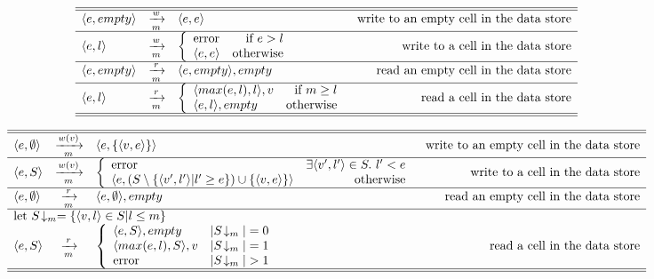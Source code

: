 

\begin{table*}
\[
\begin{array}{lclr}
\hline\hline
\langle e,empty \rangle & \xrightarrow[m]{w} & \langle e,e \rangle & \mbox{write to an empty cell in the data store}\\
\hline
\langle e,l \rangle & \xrightarrow[m]{w} & \left \{ \begin{array}{lr} \mbox{error} & \mbox{if} ~ e > l \\ \langle e,e \rangle & \mbox{otherwise} \end{array} \right. & \mbox{write to a cell in the data store}\\
\hline
\langle e,empty \rangle & \xrightarrow[m]{r} & \langle e,empty \rangle, empty & \mbox{read an empty cell in the data store}\\
\hline
\langle e,l \rangle & \xrightarrow[m]{r} & \left \{ \begin{array}{lr} \langle max(e,l),l \rangle, v & \mbox{if} ~ m \geq l \\ \langle e,l \rangle, empty & \mbox{otherwise} \end{array} \right. & \mbox{read a cell in the data store}\\
\hline\hline
\end{array}
\]
\caption{\label{ta:ifc-total}%
Small-step operational semantics for enforcing IFC with a total order over the security labels. $m$ is a paramater of the program execution s.t. m is the maximal security label allowed for the execution.}
\end{table*}

\begin{table*}
\[
\begin{array}{lclr}
\hline\hline
\semrule{\tuple{e,\emptyset}}{w(v)}{\tuple{e,\{\tuple{v,e}\}}}{\mbox{write to an empty cell in the data store}}\\
\hline
\semrule{\tuple{e,S}}
        {w(v)}
        {\case{\mbox{error}}
              {\exists \tuple{v',l'} \in S. ~ l' < e}
              {\tuple{e,(S \setminus \{\tuple{v',l'} | l' \geq e \}) \cup \{\tuple{v,e}\}}}
              {\mbox{otherwise}}}
        {\mbox{write to a cell in the data store}}\\
\hline
\semrule{\tuple{e,\emptyset}} {r} {\tuple{e,\emptyset}, empty} {\mbox{read an empty cell in the data store}}\\
\hline
\multicolumn{4} {l} {\mbox{let}~ S\!\downarrow_m = \{\tuple{v,l}\in S | l \leq m\} }\\
\semrule{\tuple{e,S}}
        {r}
        {\casethree{\tuple{e,S}, empty} {|S\!\downarrow_m| = 0}
                   {\tuple{max(e,l), S}, v} {|S\!\downarrow_m| = 1}
                   {\mbox{error}}{|S\!\downarrow_m| > 1}}
        {\mbox{read a cell in the data store}}\\
\hline\hline
\end{array}
\]
\caption{\label{ta:ifc-partial}%
Small-step operational semantics for enforcing IFC with a partial order over the security labels. $m$ is a paramater of the program execution s.t. m is the maximal security label allowed for the execution.}
\end{table*}

